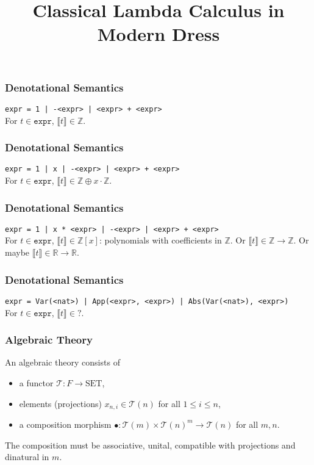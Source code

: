 \documentclass[aspectratio=169]{fancyslides} %
\title{Classical Lambda Calculus in Modern Dress}
\begin{document}
  \maketitle

  \begin{frame}
    \frametitle{Denotational Semantics}

    \texttt{expr = 1 | -<expr> | <expr> + <expr>}\\
    \pause
    For $ t \in \mathtt{expr} $, $ \llbracket t \rrbracket \in \mathbb Z $.
  \end{frame}

  \begin{frame}
    \frametitle{Denotational Semantics}

    \texttt{expr = 1 | x | -<expr> | <expr> + <expr>}\\
    \pause
    For $ t \in \mathtt{expr} $, $ \llbracket t \rrbracket \in \mathbb Z \oplus x \cdot \mathbb Z $.
  \end{frame}

  \begin{frame}
    \frametitle{Denotational Semantics}

    \texttt{expr = 1 | x * <expr> | -<expr> | <expr> + <expr>}\\
    \pause
    For $ t \in \mathtt{expr} $, $ \llbracket t \rrbracket \in \mathbb Z[x] $: polynomials with coefficients in $ \mathbb Z $.
    \pause
    Or $ \llbracket t \rrbracket \in \mathbb Z \to \mathbb Z $. Or maybe $ \llbracket t \rrbracket \in \mathbb R \to \mathbb R $.
  \end{frame}

  \begin{frame}
    \frametitle{Denotational Semantics}

    \texttt{expr = Var(<nat>) | App(<expr>, <expr>) | Abs(Var(<nat>), <expr>)}\\
    \pause
    For $ t \in \mathtt{expr} $, $ \llbracket t \rrbracket \in ? $.\\
  \end{frame}

  \begin{frame}
    \frametitle{Algebraic Theory}

    \begin{definition}
      An algebraic theory consists of
      \begin{itemize}
        \item a functor $ \mathcal T: F \to \mathrm{SET} $,
        \item elements (projections) $ x_{n, i} \in \mathcal T(n) $ for all $ 1 \leq i \leq n $,
        \item a composition morphism $ \bullet: \mathcal T(m) \times \mathcal T(n)^m \to \mathcal T(n) $ for all $ m, n $.
      \end{itemize}
      The composition must be associative, unital, compatible with projections and dinatural in $ m $.
    \end{definition}
  \end{frame}
\end{document}
